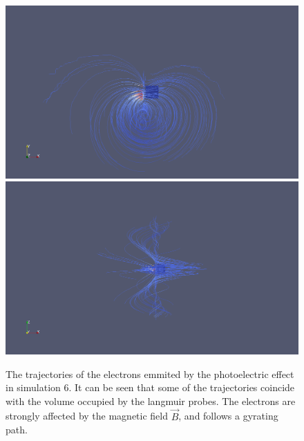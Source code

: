 	\begin{figure}
		\includegraphics[width = 0.49 \textwidth]{images/case6_jph_paths}
		\includegraphics[width = 0.49 \textwidth]{images/case6_jph_paths_2}
		\caption{The trajectories of the electrons emmited by the photoelectric effect in simulation \(6\). It can be seen that some
		of the trajectories coincide with the volume occupied by the langmuir probes. The electrons are strongly affected by the magnetic
		field \(\vec{B}\), and follows a gyrating path.}
 	\end{figure}
